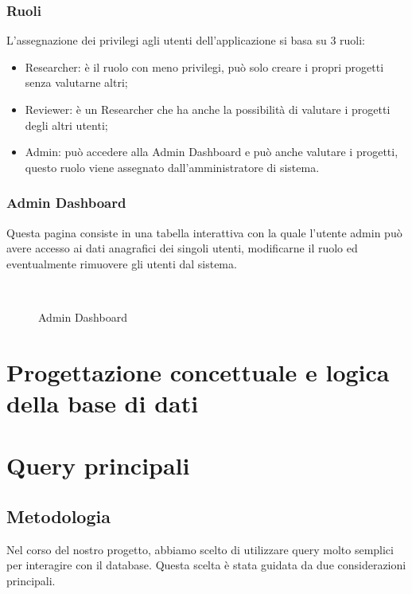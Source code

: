 \documentclass{article}
\begin{document}
\subsubsection{Ruoli}
L'assegnazione dei privilegi agli utenti dell'applicazione si basa su 3 ruoli: 
\begin{itemize}
    \item Researcher: è il ruolo con meno privilegi, può solo creare i propri progetti senza valutarne altri;
    \item Reviewer: è un Researcher che ha anche la possibilità di valutare i progetti degli altri utenti;
    \item Admin: può accedere alla Admin Dashboard e può anche valutare i progetti, questo ruolo viene assegnato dall'amministratore di sistema.
\end{itemize}
\subsubsection{Admin Dashboard}
Questa pagina consiste in una tabella interattiva con la quale l'utente admin può avere accesso ai dati anagrafici dei singoli utenti, modificarne il ruolo ed eventualmente rimuovere gli utenti dal sistema.
\begin{figure}[!h] 
    \centering
    \\
    \caption{Admin Dashboard}
\end{figure}

\section{Progettazione concettuale e logica della base di dati}

\section{Query principali}
\subsection{Metodologia}
Nel corso del nostro progetto, abbiamo scelto di utilizzare query molto semplici per interagire con il database. Questa scelta è stata guidata da due considerazioni principali.
\end{document}
